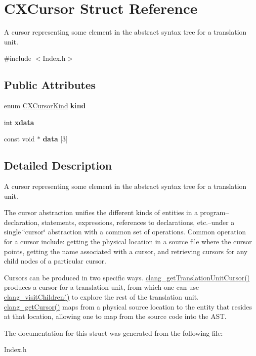 \hypertarget{structCXCursor}{}\section{C\+X\+Cursor Struct Reference}
\label{structCXCursor}


A cursor representing some element in the abstract syntax tree for a translation unit.  




{\ttfamily \#include $<$Index.\+h$>$}

\subsection*{Public Attributes}
\begin{DoxyCompactItemize}
\item 
\mbox{\label{structCXCursor_af888eaf0e8a90bd6c72c0f40a6a54230}} 
enum \mbox{\hyperlink{group__CINDEX_gaaccc432245b4cd9f2d470913f9ef0013}{C\+X\+Cursor\+Kind}} {\bfseries kind}
\item 
\mbox{\label{structCXCursor_a6d8d6834224ca47d8e64a12696fe904d}} 
int {\bfseries xdata}
\item 
\mbox{\label{structCXCursor_a31e495c1b7ed42d2c093e6d9a09c59a3}} 
const void $\ast$ {\bfseries data} \mbox{[}3\mbox{]}
\end{DoxyCompactItemize}


\subsection{Detailed Description}
A cursor representing some element in the abstract syntax tree for a translation unit. 

The cursor abstraction unifies the different kinds of entities in a program--declaration, statements, expressions, references to declarations, etc.--under a single \char`\"{}cursor\char`\"{} abstraction with a common set of operations. Common operation for a cursor include\+: getting the physical location in a source file where the cursor points, getting the name associated with a cursor, and retrieving cursors for any child nodes of a particular cursor.

Cursors can be produced in two specific ways. \mbox{\hyperlink{group__CINDEX__CURSOR__MANIP_gaec6e69127920785e74e4a517423f4391}{clang\+\_\+get\+Translation\+Unit\+Cursor()}} produces a cursor for a translation unit, from which one can use \mbox{\hyperlink{group__CINDEX__CURSOR__TRAVERSAL_ga5d0a813d937e1a7dcc35f206ad1f7a91}{clang\+\_\+visit\+Children()}} to explore the rest of the translation unit. \mbox{\hyperlink{group__CINDEX__CURSOR__SOURCE_ga30a9972c7e099ab2735fa6c45e247ec8}{clang\+\_\+get\+Cursor()}} maps from a physical source location to the entity that resides at that location, allowing one to map from the source code into the A\+ST. 

The documentation for this struct was generated from the following file\+:\begin{DoxyCompactItemize}
\item 
Index.\+h\end{DoxyCompactItemize}
